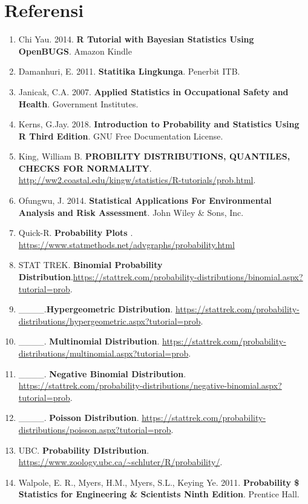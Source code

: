 \documentclass[]{book}
\providecommand{\tightlist}{%
  \setlength{\itemsep}{0pt}\setlength{\parskip}{0pt}}
\begin{document}
\section{Referensi}\label{referensi-8}

\begin{enumerate}
\def\labelenumi{\arabic{enumi}.}
\tightlist
\item
  Chi Yau. 2014. \textbf{R Tutorial with Bayesian Statistics Using
  OpenBUGS}. Amazon Kindle
\item
  Damanhuri, E. 2011. \textbf{Statitika Lingkunga}. Penerbit ITB.
\item
  Janicak, C.A. 2007. \textbf{Applied Statistics in Occupational Safety
  and Health}. Government Institutes.
\item
  Kerns, G.Jay. 2018. \textbf{Introduction to Probability and Statistics
  Using R Third Edition}. GNU Free Documentation License.
\item
  King, William B. \textbf{PROBILITY DISTRIBUTIONS, QUANTILES, CHECKS
  FOR NORMALITY}.
  \url{http://ww2.coastal.edu/kingw/statistics/R-tutorials/prob.html}.
\item
  Ofungwu, J. 2014. \textbf{Statistical Applications For Environmental
  Analysis and Risk Assessment}. John Wiley \& Sons, Inc.
\item
  Quick-R. \textbf{Probability Plots }.
  \url{https://www.statmethods.net/advgraphs/probability.html}
\item
  STAT TREK. \textbf{Binomial Probability
  Distribution}.\url{https://stattrek.com/probability-distributions/binomial.aspx?tutorial=prob}.
\item
  \_\_\_\_.\textbf{Hypergeometric Distribution}.
  \url{https://stattrek.com/probability-distributions/hypergeometric.aspx?tutorial=prob}.
\item
  \_\_\_\_. \textbf{Multinomial Distribution}.
  \url{https://stattrek.com/probability-distributions/multinomial.aspx?tutorial=prob}.
\item
  \_\_\_\_. \textbf{Negative Binomial Distribution}.
  \url{https://stattrek.com/probability-distributions/negative-binomial.aspx?tutorial=prob}.
\item
  \_\_\_\_. \textbf{Poisson Distribution}.
  \url{https://stattrek.com/probability-distributions/poisson.aspx?tutorial=prob}.
\item
  UBC. \textbf{Probability DIstribution}.
  \url{https://www.zoology.ubc.ca/~schluter/R/probability/}.
\item
  Walpole, E. R., Myers, H.M., Myers, S.L., Keying Ye. 2011.
  \textbf{Probability \$ Statistics for Engineering \& Scientists Ninth
  Edition}. Prentice Hall.
\end{enumerate}
\end{document}
